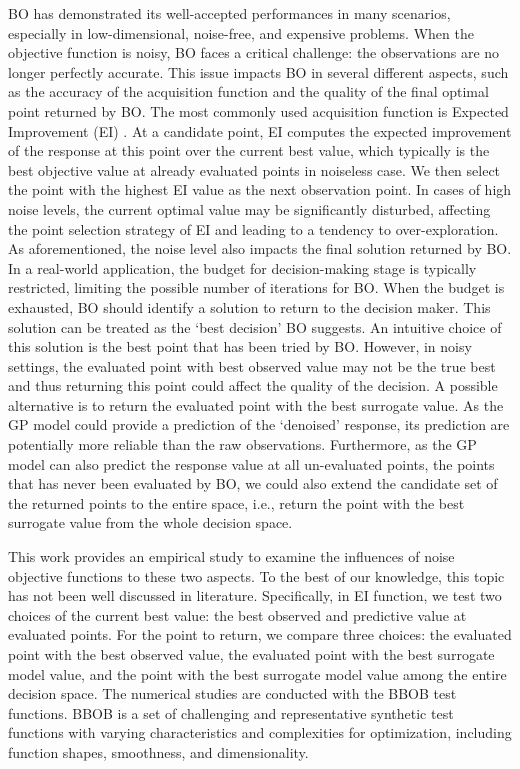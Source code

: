 \documentclass{article}
\begin{document}
\hspace{2em}
BO has demonstrated its well-accepted performances in many scenarios, especially in low-dimensional, noise-free, and expensive problems. When the objective function is noisy, BO faces a critical challenge: the observations are no longer perfectly accurate. This issue impacts BO in several different aspects, such as the accuracy of the acquisition function and the quality of the final optimal point returned by BO. The most commonly used acquisition function is Expected Improvement (EI) \citep{Jones1998Efficient}. At a candidate point, EI computes the expected improvement of the response at this point over the current best value, which typically is the best objective value at already evaluated points in noiseless case. We then select the point with the highest EI value as the next observation point. In cases of high noise levels, the current optimal value may be significantly disturbed, affecting the point selection strategy of EI and leading to a tendency to over-exploration. As aforementioned, the noise level also impacts the final solution returned by BO. In a real-world application, the budget for decision-making stage is typically restricted, limiting the possible number of iterations for BO. When the budget is exhausted, BO should identify a solution to return to the decision maker. This solution can be treated as the `best decision' BO suggests. An intuitive choice of this solution is the best point that has been tried by BO. However, in noisy settings, the evaluated point with best observed value may not be the true best and thus returning this point could affect the quality of the decision. A possible alternative is to return the evaluated point with the best surrogate value. As the GP model could provide a prediction of the `denoised' response, its prediction are potentially more reliable than the raw observations. Furthermore, as the GP model can also predict the response value at all un-evaluated points, the points that has never been evaluated by BO, we could also extend the candidate set of the returned points to the entire space, i.e., return the point with the best surrogate value from the whole decision space. 

\hspace{2em}
This work provides an empirical study to examine the influences of noise objective functions to these two aspects. To the best of our knowledge, this topic has not been well discussed in literature. Specifically, in EI function, we test two choices of the current best value: the best observed and predictive value at evaluated points. For the point to return, we compare three choices: the evaluated point with the best observed value, the evaluated point with the best surrogate model value, and the point with the best surrogate model value among the entire decision space. The numerical studies are conducted with the BBOB \citep{Hansen2010RealParameterBO} test functions. BBOB is a set of challenging and representative synthetic test functions with varying characteristics and complexities for optimization, including function shapes, smoothness, and dimensionality. 
\end{document}
